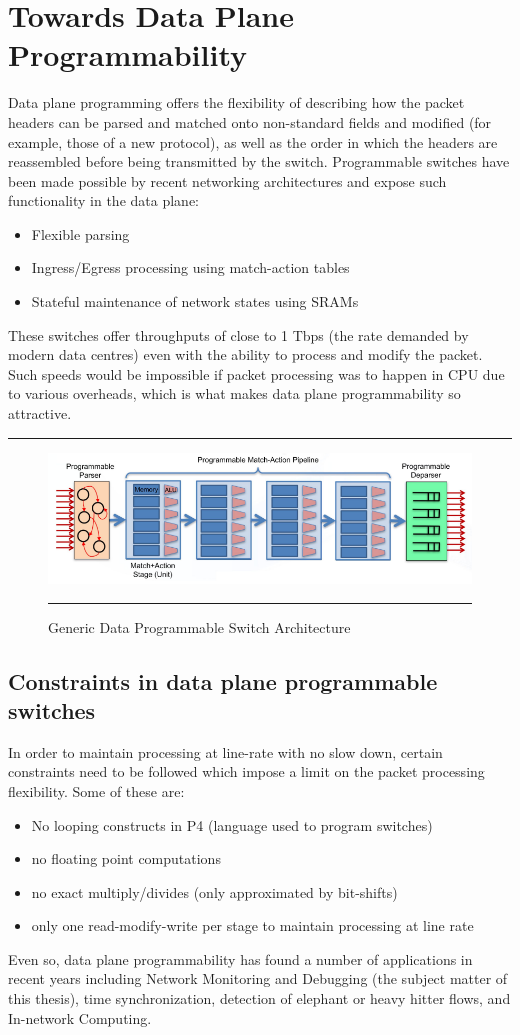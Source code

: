 \section{Towards Data Plane Programmability}
Data plane programming offers the flexibility of describing how the packet headers can be parsed and matched onto non-standard
fields and modified (for example, those of a new protocol), as well as the order in which the headers are reassembled before being
transmitted by the switch. Programmable switches have been made possible by recent networking architectures and expose such functionality
in the data plane:
\begin{itemize}
  \item Flexible parsing
  \item Ingress/Egress processing using match-action tables
  \item Stateful maintenance of network states using SRAMs
\end{itemize}
These switches offer throughputs of close to 1 Tbps (the rate demanded by modern data centres) even with the ability to process and modify the packet. Such speeds would be impossible if packet processing was to happen in CPU due to various overheads, which is what makes data plane programmability so attractive.
\newline
\rule{\textwidth}{0.4pt}
\begin{figure}[htbp]
	\centering
		\includegraphics[width=1.0\columnwidth]{Figures/MatchAction.png}
		\rule{35em}{0.5pt}
	\caption[Match Action Pipeline]{Generic Data Programmable Switch Architecture}
	\label{fig:Match Action}
\end{figure}

\subsection{Constraints in data plane programmable switches}
In order to maintain processing at line-rate with no slow down, certain constraints need to be followed which impose a limit on the packet processing flexibility. Some of these are:
\begin{itemize}
  \item No looping constructs in P4 (language used to program switches)
  \item no floating point computations
  \item no exact multiply/divides (only approximated by bit-shifts)
  \item only one read-modify-write per stage to maintain processing at line rate
\end{itemize}
Even so, data plane programmability has found a number of applications in recent years including Network Monitoring and Debugging (the subject matter of this thesis), time synchronization, detection of elephant or heavy hitter flows, and In-network Computing.
